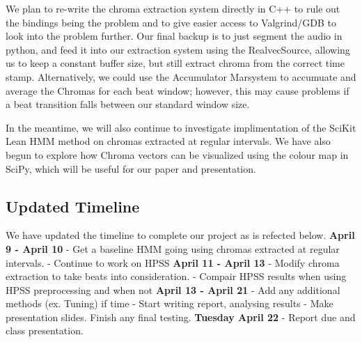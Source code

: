 \documentclass{article}
\begin{document}
We plan to re-write the chroma extraction system directly in C++ to rule out the bindings being the problem and to give easier access to Valgrind/GDB to look into the problem further. Our final backup is to just segment the audio in python, and feed it into our extraction system using the
RealvecSource, allowing us to keep a constant buffer size, but still extract chroma from the correct time stamp. Alternatively, we could use the Accumulator Marsystem to accumuate and average the Chromas for each beat window; however, this may cause problems if a beat transition falls between our standard window size. 

In the meantime, we will also continue to investigate implimentation of the SciKit Lean HMM method on chromas extracted at regular intervals. We have also begun to explore how Chroma vectors can be visualized using the colour map in SciPy, which will be useful for our paper and presentation.

\subsection{Updated Timeline}

We have updated the timeline to complete our project as is refected below. \newline \newline
{\bf April 9 - April 10}\newline
- Get a baseline HMM going using chromas extracted at regular intervals. \newline
- Continue to work on HPSS
\newline
\newline
{\bf April 11 - April 13}\newline
- Modify chroma extraction to take beats into consideration. \newline
- Compair HPSS results when using HPSS preprocessing and when not
\newline
\newline
{\bf April 13 - April 21}\newline
- Add any additional methods (ex. Tuning) if time \newline
- Start writing report, analysing results \newline
- Make presentation slides. Finish any final testing.
\newline
\newline
{\bf Tuesday April 22}\newline
- Report due and class presentation. 
\end{document}
